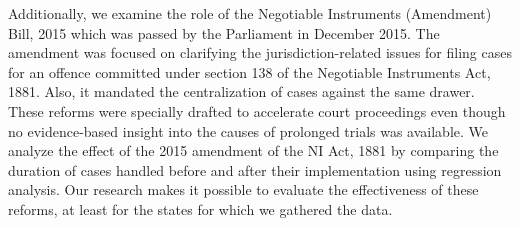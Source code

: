 \documentclass[12pt,a4paper]{article}
\begin{document}




Additionally, we examine the role of the Negotiable Instruments (Amendment) Bill, 2015 which was passed by the Parliament in December 2015. The amendment was focused on clarifying the jurisdiction-related issues for filing cases for an offence committed under section 138 of the Negotiable Instruments Act, 1881. Also, it mandated the centralization of cases against the same drawer. These reforms were specially drafted to accelerate court proceedings even though no evidence-based insight into the causes of prolonged trials was available. We analyze the effect of the 2015 amendment of the NI Act, 1881 by comparing the duration of cases handled before and after their implementation using regression analysis. Our research makes it possible to evaluate the effectiveness of these reforms, at least for the states for which we gathered the data.
\end{document}
